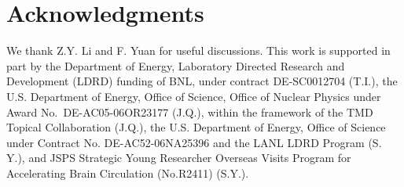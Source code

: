 \section*{Acknowledgments}

We thank Z.Y. Li and F. Yuan for useful discussions.  This work is supported in part by the Department of Energy, Laboratory Directed Research and Development (LDRD) funding of BNL, under contract DE-SC0012704 (T.I.), the U.S. Department of Energy, Office of Science, Office of Nuclear Physics under Award No.~DE-AC05-06OR23177 (J.Q.), within the framework of the TMD Topical Collaboration (J.Q.), the U.S. Department of Energy, Office of Science under Contract No. DE-AC52-06NA25396 and the LANL LDRD Program (S. Y.), and  JSPS Strategic Young Researcher Overseas Visits Program for Accelerating Brain Circulation (No.R2411) (S.Y.).


